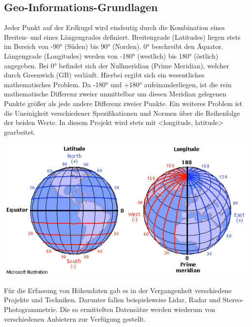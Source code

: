 \subsection*{Geo-Informations-Grundlagen}
Jeder Punkt auf der Erdkugel wird eindeutig durch die Kombination eines Breiten- und eines Längengrades definiert.
Breitengrade (Latitudes) liegen stets im Bereich von -90° (Süden) bis 90° (Norden). 0° beschreibt den Äquator.
Längengrade (Longitudes) werden von -180° (westlich) bis 180° (östlich) angegeben. Bei 0° befindet sich der Nullmeridian (Prime Meridian), welcher durch Greenwich (GB) verläuft.
Hierbei ergibt sich ein wesentliches mathematisches Problem.
Da -180° und +180° aufeinanderliegen, ist die rein mathematische Differenz zweier unmittelbar um diesen Meridian gelegenen Punkte größer als jede andere Differenz zweier Punkte.
Ein weiteres Problem ist die Uneinigkeit verschiedener Spezifikationen und Normen über die Reihenfolge der beiden Werte.
In diesem Projekt wird stets mit <longitude, latitude> gearbeitet.

\begin{center}
    \includegraphics[width=\columnwidth]{images/lat-lon-world}
    \label{fig:REPLACE}
\end{center}

Für die Erfassung von Höhendaten gab es in der Vergangenheit verschiedene Projekte und Techniken.
Darunter fallen beispielsweise Lidar, Radar und Stereo-Photogrammetrie. Die so ermittelten Datensätze werden wiederum von verschiedenen Anbietern zur Verfügung gestellt.